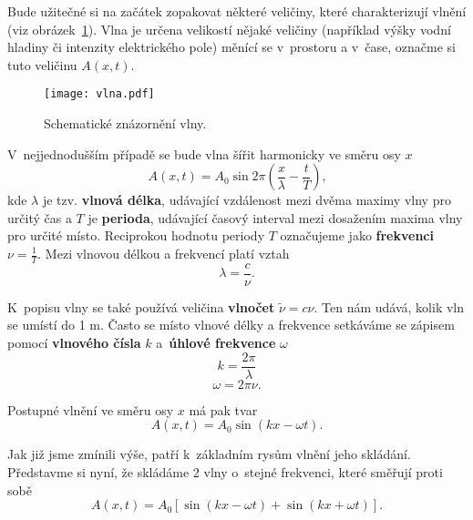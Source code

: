 Bude užitečné si na začátek zopakovat některé veličiny, které charakterizují vlnění (viz obrázek~\ref{obr:Vlna}).
Vlna je určena velikostí nějaké veličiny (například výšky vodní hladiny či intenzity elektrického pole) měnící se v~prostoru a v~čase, označme si tuto veličinu $A(x,t)$. 
\begin{figure} [ht]
\centering
\texttt{[image: vlna.pdf]}
\caption[Znázornění vlny]{Schematické  znázornění vlny.}
\label{obr:Vlna}
\end{figure}

V~nejjednodušším případě se bude vlna šířit harmonicky ve směru osy $x$
\begin{equation}
A(x, t) = A_0 \sin2\pi \left ( \frac{x}{\lambda}-\frac{t}{T} \right) \mbox{,}
\label{rov:Vlna}
\end{equation}
kde $\lambda$ je tzv. \textbf{vlnová délka}, udávající vzdálenost mezi dvěma maximy vlny pro určitý čas a $T$ je \textbf{perioda}, udávající časový interval mezi dosažením maxima vlny pro určité místo. Reciprokou hodnotu periody $T$ označujeme jako  \textbf{frekvenci} $\nu = \frac{1}{T}$. Mezi vlnovou délkou a frekvencí platí vztah
\begin{equation}
\lambda = \frac{c}{\nu}\mbox{.}
\label{rov:Vlna2}
\end{equation}

\noindent K~popisu vlny se také používá veličina \textbf{vlnočet} $\tilde{\nu}=c\nu$\mbox{.} Ten nám udává, kolik vln se umístí do 1 m.
Často se místo vlnové délky a frekvence setkáváme se zápisem pomocí \textbf{vlnového čísla} $k$ a~\textbf{úhlové frekvence} $\omega$
\begin{equation}
k = \frac{2\pi}{\lambda}\mbox{}
\label{rov:Vlna3}
\end{equation}
\begin{equation}
\omega = 2\pi\nu\mbox{.}
\label{rov:Vlna4}
\end{equation}

\noindent Postupné vlnění ve směru osy $x$ má pak tvar
\begin{equation}
A(x,t)=A_0 \sin(kx - \omega t).
\label{rov:Vlna5}
\end{equation}

\noindent Jak již jsme zmínili výše, patří k~základním rysům vlnění jeho skládání. Představme si nyní, že skládáme 2 vlny o~stejné frekvenci, které směřují proti sobě
\begin{equation}
A(x,t)=A_0[\sin (kx-\omega t)+ \sin (kx+\omega t)]\mbox{.}
\label{rov:Vlna6}
\end{equation}

